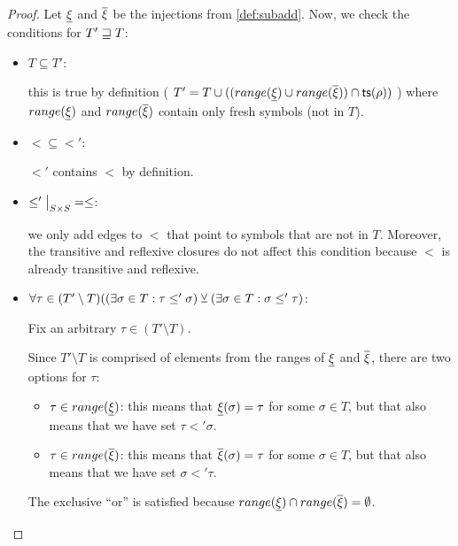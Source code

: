 \documentclass[main.tex]{subfiles}
\begin{document}
\begin{proof}
    Let $\underline{\xi}$ and $\overline{\xi}$ be the injections from \cref{def:subadd}.
    Now, we check the conditions for $T' \sqsupseteq T$:
    \begin{itemize}
        \item $T \subseteq T'$:

            this is true by definition (
            $T' = T \cup ((range(\underline{\xi}) \cup range(\overline{\xi})) \cap \mathsf{ts}(\rho))$
            ) where $range(\underline{\xi})$ and $range(\overline{\xi})$ contain
            only fresh symbols (not in $T$).

        \item $\less \subseteq \less'$:

            $\less'$ contains $\less$ by definition.

        \item $\restr{\less'}{S \times S} = \less$:

            we only add edges to $\less$ that point to symbols that are not
            in $T$. Moreover, the transitive and reflexive closures do not
            affect this condition because $\less$ is already transitive and
            reflexive.

        \item $\forall \tau \in (T' \setminus T) ((\exists \sigma \in T : \tau \leq' \sigma )
            \veebar (\exists \sigma \in T : \sigma \leq' \tau)$:

            Fix an arbitrary $\tau \in (T' \setminus T)$.

            Since $T' \setminus T$ is comprised of elements from the ranges
            of $\underline{\xi}$ and $\overline{\xi}$, there are two options
            for $\tau$:
            \begin{itemize}
                \item $\tau \in range(\underline{\xi})$: this means that
                    $\underline{\xi}(\sigma) = \tau$ for some $\sigma \in T$, but that
                    also means that we have set $\tau \less' \sigma$.
                \item $\tau \in range(\overline{\xi})$: this means that
                    $\overline{\xi}(\sigma) = \tau$ for some $\sigma \in T$, but that
                    also means that we have set $\sigma \less' \tau$.
            \end{itemize}

            The exclusive ``or'' is satisfied because
            $range(\underline{\xi}) \cap range(\overline{\xi}) = \emptyset$.
    \end{itemize}
\end{proof}
\end{document}

